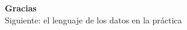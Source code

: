 \documentclass[aspectratio=169]{beamer}
\begin{document}
\begin{frame}[plain]
  \molinaBanner
  \vfill
  \begin{center}
    {\color{molMorado}\Large\bfseries Gracias}\\[0.4em]
    {\color{molTeal} Siguiente: el lenguaje de los datos en la pr\'actica}
  \end{center}
  \vfill\vspace{1.0cm}
  \molinaLogos
\end{frame}
\end{document}
